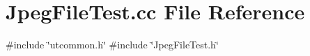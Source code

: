 \section{Jpeg\+File\+Test.\+cc File Reference}
\label{JpegFileTest_8cc}
{\ttfamily \#include \char`\"{}utcommon.\+h\char`\"{}}\newline
{\ttfamily \#include \char`\"{}Jpeg\+File\+Test.\+h\char`\"{}}\newline
